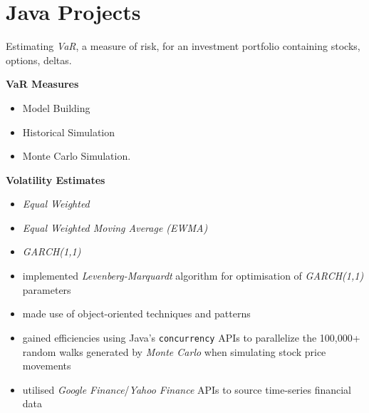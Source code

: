 \documentclass[letterpaper,11pt]{article}
\begin{document}
\section{Java Projects}
\begin{description}[style=multiline,leftmargin=4cm]

	\item[Value at Risk \textnormal{Dissertation} \textnormal{\tiny
		      \href{https://adrian.ng/java/var/}{adrian.ng/java/var/}}]
	      Estimating \textit{VaR}, a measure of risk, for an investment portfolio containing stocks, options, deltas.

	      \begin{minipage}[b]{0.2\textwidth}
		      \vspace{0.25cm}
		      \textbf{VaR Measures}
		      \begin{itemize}[leftmargin=*]
			      \tiny
			      \item Model Building
			      \item Historical Simulation
			      \item Monte Carlo Simulation.
		      \end{itemize}
		      \textbf{Volatility Estimates}
		      \begin{itemize}[leftmargin=*]
			      \tiny
			      \item \textit{Equal Weighted}
			      \item \textit{Equal Weighted Moving Average (EWMA)}
			      \item \textit{GARCH(1,1)}
		      \end{itemize}
	      \end{minipage}
	      \hspace{0.25cm}
	      \begin{minipage}[b]{0.55\textwidth}

		      \begin{itemize}[leftmargin=*]
			      \item implemented \textit{Levenberg-Marquardt} algorithm for optimisation of \textit{GARCH(1,1)} parameters
			      \item made use of object-oriented techniques and patterns
			      \item gained efficiencies using Java's \texttt{concurrency} APIs to parallelize the 100,000+ random walks generated by \textit{Monte Carlo} when simulating stock price movements
			      \item utilised \textit{Google Finance}/\textit{Yahoo Finance} APIs to source time-series financial data
		      \end{itemize}
	      \end{minipage}


\end{description}
\end{document}
